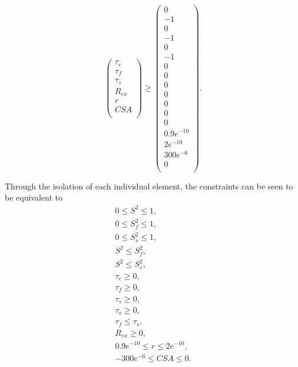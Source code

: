 \begin{equation}
\begin{pmatrix}
        \tau_e \\
        \tau_f \\
        \tau_s \\
        R_{ex} \\
         r \\
        CSA \\
    \end{pmatrix}
    \geqslant
    \begin{pmatrix}
        0 \\
        -1 \\
        0 \\
        -1 \\
        0 \\
        -1 \\
        0 \\
        0 \\
        0 \\
        0 \\
        0 \\
        0 \\
        0 \\
        0.9e^{-10} \\
        2e^{-10} \\
        300e^{-6} \\
        0 \\
    \end{pmatrix}.
\end{equation}

\noindent  Through the isolation of each individual element, the constraints can be seen to be equivalent to
\begin{subequations}
\begin{gather} 
    0 \leqslant S^2 \leqslant 1, \\
    0 \leqslant S^2_f \leqslant 1, \\
    0 \leqslant S^2_s \leqslant 1, \\
    S^2 \leqslant S^2_f, \\
    S^2 \leqslant S^2_s, \\
    \tau_e \geqslant 0, \\
    \tau_f \geqslant 0, \\
    \tau_s \geqslant 0, \\
    \tau_s \geqslant 0, \\
    \tau_f \leqslant \tau_s, \\
    R_{ex} \geqslant 0, \\
    0.9e^{-10} \leqslant r \leqslant 2e^{-10}, \\
    -300e^{-6} \leqslant CSA \leqslant 0.
\end{gather} 
\end{subequations}

